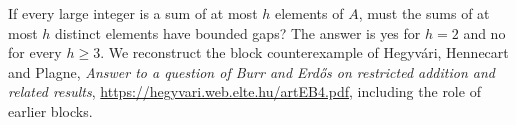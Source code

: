 If every large integer is a sum of at most $h$ elements of $A$, must the sums of at most $h$ distinct elements have bounded gaps? The answer is yes for $h=2$ and no for every $h\ge3$. We reconstruct the block counterexample of Hegyv\'ari, Hennecart and Plagne, \emph{Answer to a question of Burr and Erd\H{o}s on restricted addition and related results}, \url{https://hegyvari.web.elte.hu/artEB4.pdf}, including the role of earlier blocks.
